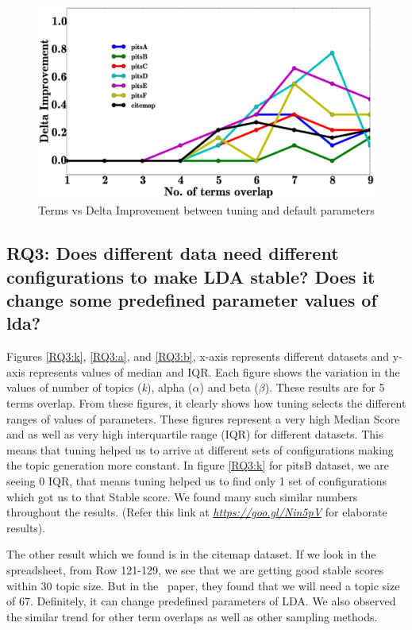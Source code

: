 \documentclass[10pt,conference]{IEEEtran}
\theoremstyle{break}
\begin{document}
\begin{center}
\begin{figure}[!htbp]
  \includegraphics[width=\linewidth]{./fig/tuned_delta_vem.eps}
  \caption{Terms vs Delta Improvement between tuning and default parameters}
  \label{fig:delta}
\end{figure}
\end{center}

\subsection{\textbf{RQ3: Does different data need different configurations to make LDA stable? Does it change some predefined parameter values of lda?}}

Figures \ref{RQ3:k}, \ref{RQ3:a}, and \ref{RQ3:b}, x-axis represents different datasets and y-axis represents values of median and IQR. Each figure shows the variation in the values of number of topics (\textit{k}), alpha ($\alpha$) and beta ($\beta$). These results are for 5 terms overlap. From these figures, it clearly shows how tuning selects the different ranges of values of parameters. These figures represent a very high Median Score and as well as very high interquartile range (IQR) for different datasets. This means that tuning helped us to arrive at different sets of configurations making the topic generation more constant. In figure \ref{RQ3:k} for pitsB dataset, we are seeing 0 IQR, that means tuning helped us to find only 1 set of configurations which got us to that Stable score. We found many such similar numbers throughout the results. (Refer this link at \href{https://goo.gl/Nin5pV}{\textit{https://goo.gl/Nin5pV}} for elaborate results).

The other result which we found is in the citemap dataset. If we look in the spreadsheet, from Row 121-129, we see that we are getting good stable scores within 30 topic size. But in the~\cite{garousi2016citations} paper, they found that we will need a topic size of 67. Definitely, it can change predefined parameters of LDA.
We also observed the similar trend for other term overlaps as well as other sampling methods.
\end{document}
